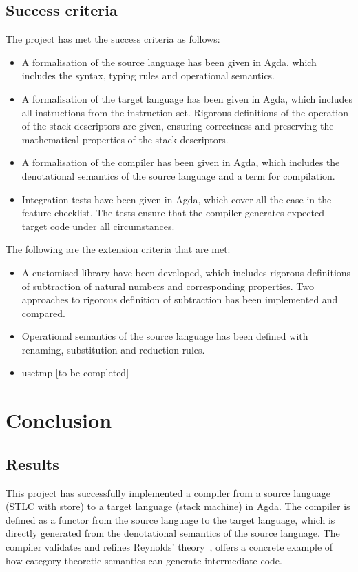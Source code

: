 \documentclass[12pt,a4paper]{report}
\theoremstyle{definition}
\begin{document}
    \section{Success criteria}
    The project has met the success criteria as follows:
    \begin{itemize}
        \item
            A formalisation of the source language has been given in Agda, which includes the syntax, typing rules and operational semantics. 

        \item
            A formalisation of the target language has been given in Agda, which includes all instructions from the instruction set. Rigorous definitions of the operation of the stack descriptors are given, ensuring correctness and preserving the mathematical properties of the stack descriptors.
        
        \item
            A formalisation of the compiler has been given in Agda, which includes the denotational semantics of the source language and a term for compilation.

        \item 
            Integration tests have been given in Agda, which cover all the case in the feature checklist. The tests ensure that the compiler generates expected target code under all circumstances.
    \end{itemize}

    The following are the extension criteria that are met:
    \begin{itemize}
        \item 
            A customised library have been developed, which includes rigorous definitions of subtraction of natural numbers and corresponding properties. Two approaches to rigorous definition of subtraction has been implemented and compared.
        \item
            Operational semantics of the source language has been defined with renaming, substitution and reduction rules.
        \item
            usetmp [to be completed]

    \end{itemize}

\chapter{Conclusion}
    \minitoc
    \section{Results}
    This project has successfully implemented a compiler from a source language (STLC with store) to a target language (stack machine) in Agda. The compiler is defined as a functor from the source language to the target language, which is directly generated from the denotational semantics of the source language. The compiler validates and refines Reynolds' theory~\autocite{Reynolds}, offers a concrete example of how category-theoretic semantics can generate intermediate code.
\end{document}

